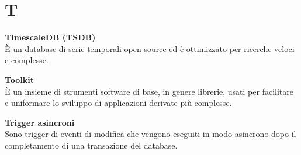 \section{T}
\textbf{TimescaleDB (TSDB)}\\
È un database di serie temporali open source ed è ottimizzato per ricerche veloci e complesse.

\textbf{Toolkit}\\
È un insieme di strumenti software di base, in genere librerie, usati per facilitare e uniformare lo sviluppo di applicazioni derivate più complesse.

\textbf{Trigger asincroni}\\
Sono trigger di eventi di modifica che vengono eseguiti in modo asincrono dopo il completamento di una transazione del database.

\clearpage